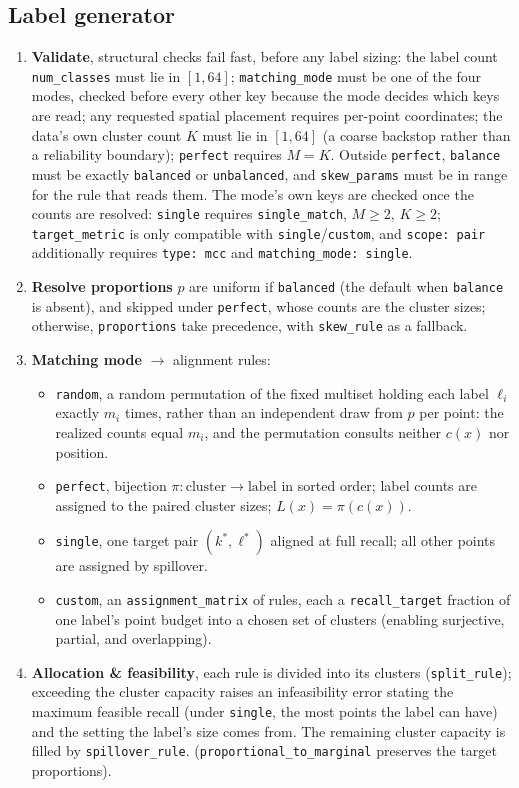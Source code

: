 \documentclass[a4paper,12pt]{article}
\begin{document}
\subsection{Label generator}
\begin{enumerate}
    \item \textbf{Validate}, structural checks fail fast, before any label sizing: the label count \texttt{num\_classes} must lie in $[1,64]$; \texttt{matching\_mode} must be one of the four modes, checked before every other key because the mode decides which keys are read; any requested spatial placement requires per-point coordinates; the data's own cluster count $K$ must lie in $[1,64]$ (a coarse backstop rather than a reliability boundary); \texttt{perfect} requires $M = K$. Outside \texttt{perfect}, \texttt{balance} must be exactly \texttt{balanced} or \texttt{unbalanced}, and \texttt{skew\_params} must be in range for the rule that reads them. The mode's own keys are checked once the counts are resolved: \texttt{single} requires \texttt{single\_match}, $M \ge 2$, $K \ge 2$; \texttt{target\_metric} is only compatible with \texttt{single}/\texttt{custom}, and \texttt{scope: pair} additionally requires \texttt{type: mcc} and \texttt{matching\_mode: single}.
    \item \textbf{Resolve proportions} $p$ are uniform if \texttt{balanced} (the default when \texttt{balance} is absent), and skipped under \texttt{perfect}, whose counts are the cluster sizes; otherwise, \texttt{proportions} take precedence, with \texttt{skew\_rule} as a fallback.
    \item \textbf{Matching mode} $\to$ alignment rules:
    \begin{itemize}
        \item \texttt{random}, a random permutation of the fixed multiset holding each label $\ell_i$ exactly $m_i$ times, rather than an independent draw from $p$ per point: the realized counts equal $m_i$, and the permutation consults neither $c(x)$ nor position.
        \item \texttt{perfect}, bijection $\pi: \text{cluster} \to \text{label}$ in sorted order; label counts are assigned to the paired cluster sizes; $L(x) = \pi(c(x))$.
        \item \texttt{single}, one target pair $(k^*, \ell^*)$ aligned at full recall; all other points are assigned by spillover.
        \item \texttt{custom}, an \texttt{assignment\_matrix} of rules, each a \texttt{recall\_target} fraction of one label's point budget into a chosen set of clusters (enabling surjective, partial, and overlapping).
    \end{itemize}
    \item \textbf{Allocation \& feasibility}, each rule is divided into its clusters (\texttt{split\_rule}); exceeding the cluster capacity raises an infeasibility error stating the maximum feasible recall (under \texttt{single}, the most points the label can have) and the setting the label's size comes from. The remaining cluster capacity is filled by \texttt{spillover\_rule}. (\texttt{proportional\_to\_marginal} preserves the target proportions).
    

\end{enumerate}
\end{document}
